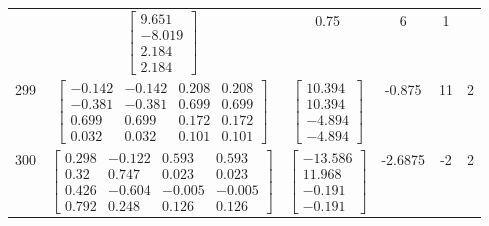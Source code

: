 \documentclass[a4paper,12pt]{article}
\begin{document}
\begin{tabular}{c c c c c c}
&
$\begin{bmatrix} 9.651 \\ -8.019 \\ 2.184 \\ 2.184 \end{bmatrix}$
&
0.75
&
6
&
1
\\
299
&
$\begin{bmatrix} -0.142 & -0.142 & 0.208 & 0.208 \\ -0.381 & -0.381 & 0.699 & 0.699 \\ 0.699 & 0.699 & 0.172 & 0.172 \\ 0.032 & 0.032 & 0.101 & 0.101 \end{bmatrix}$
&
$\begin{bmatrix} 10.394 \\ 10.394 \\ -4.894 \\ -4.894 \end{bmatrix}$
&
-0.875
&
11
&
2
\\
300
&
$\begin{bmatrix} 0.298 & -0.122 & 0.593 & 0.593 \\ 0.32 & 0.747 & 0.023 & 0.023 \\ 0.426 & -0.604 & -0.005 & -0.005 \\ 0.792 & 0.248 & 0.126 & 0.126 \end{bmatrix}$
&
$\begin{bmatrix} -13.586 \\ 11.968 \\ -0.191 \\ -0.191 \end{bmatrix}$
&
-2.6875
&
-2
&
2
\\
\end{tabular} \egroup \newpage
\end{document}
